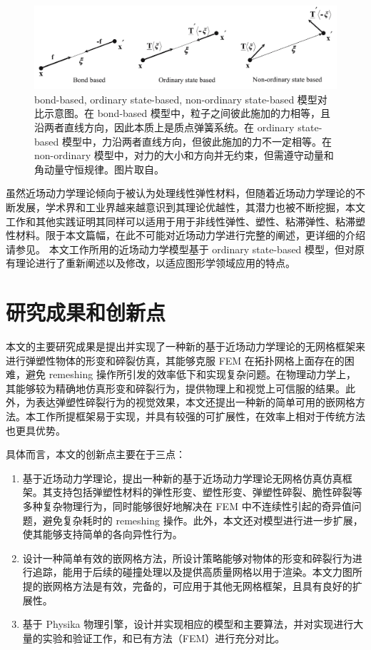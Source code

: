 \begin{figure}[htbp!]
  \centering
  \captionsetup{justification=centering}
  \includegraphics[width=\linewidth]{chap/image/peridynamics_models}

  \caption{\label{peridynamics_models}
           bond-based, ordinary state-based, non-ordinary state-based 模型对比示意图。在 bond-based 模型中，粒子之间彼此施加的力相等，且沿两者直线方向，因此本质上是质点弹簧系统。在 ordinary state-based 模型中，力沿两者直线方向，但彼此施加的力不一定相等。在 non-ordinary 模型中，对力的大小和方向并无约束，但需遵守动量和角动量守恒规律。图片取自。
          }
\end{figure}

虽然近场动力学理论倾向于被认为处理线性弹性材料，但随着近场动力学理论的不断发展，学术界和工业界越来越意识到其理论优越性，其潜力也被不断挖掘，本文工作和其他实践证明其同样可以适用于用于非线性弹性、塑性、粘滞弹性、粘滞塑性材料。限于本文篇幅，在此不可能对近场动力学进行完整的阐述，更详细的介绍请参见。 本文工作所用的近场动力学模型基于 ordinary state-based 模型，但对原有理论进行了重新阐述以及修改，以适应图形学领域应用的特点。

\section{研究成果和创新点}

本文的主要研究成果是提出并实现了一种新的基于近场动力学理论的无网格框架来进行弹塑性物体的形变和碎裂仿真，其能够克服 FEM 在拓扑网格上面存在的困难，避免 remeshing 操作所引发的效率低下和实现复杂问题。在物理动力学上，其能够较为精确地仿真形变和碎裂行为，提供物理上和视觉上可信服的结果。此外，为表达弹塑性碎裂行为的视觉效果，本文还提出一种新的简单可用的嵌网格方法。本工作所提框架易于实现，并具有较强的可扩展性，在效率上相对于传统方法也更具优势。

具体而言，本文的创新点主要在于三点：
\begin{enumerate}
  \item 基于近场动力学理论，提出一种新的基于近场动力学理论无网格仿真仿真框架。其支持包括弹塑性材料的弹性形变、塑性形变、弹塑性碎裂、脆性碎裂等多种复杂物理行为，同时能够很好地解决在 FEM 中不连续性引起的奇异值问题，避免复杂耗时的 remeshing 操作。此外，本文还对模型进行进一步扩展，使其能够支持简单的各向异性行为。
  \item 设计一种简单有效的嵌网格方法，所设计策略能够对物体的形变和碎裂行为进行追踪，能用于后续的碰撞处理以及提供高质量网格以用于渲染。本文力图所提的嵌网格方法是有效，完备的，可应用于其他无网格框架，且具有良好的扩展性。
  \item 基于 Physika 物理引擎，设计并实现相应的模型和主要算法，并对实现进行大量的实验和验证工作，和已有方法（FEM）进行充分对比。
\end{enumerate}

